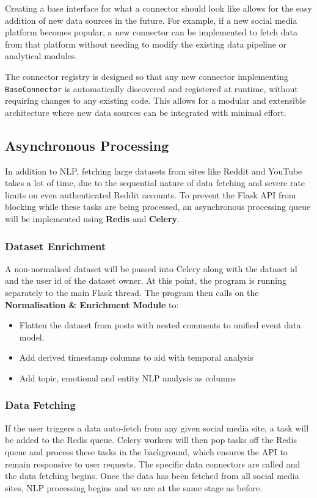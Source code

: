 \documentclass[12pt, a4paper]{article}
\begin{document}
Creating a base interface for what a connector should look like allows for the easy addition of new data sources in the future. For example, if a new social media platform becomes popular, a new connector can be implemented to fetch data from that platform without needing to modify the existing data pipeline or analytical modules.

The connector registry is designed so that any new connector implementing \texttt{BaseConnector} is automatically discovered and registered at runtime, without requiring changes to any existing code. This allows for a modular and extensible architecture where new data sources can be integrated with minimal effort.

\subsection{Asynchronous Processing}
In addition to NLP, fetching large datasets from sites like Reddit and YouTube takes a lot of time, due to the sequential nature of data fetching and severe rate limits on even authenticated Reddit accounts. To prevent the Flask API from blocking while these tasks are being processed, an asynchronous processing queue will be implemented using \textbf{Redis} and \textbf{Celery}.

\subsubsection{Dataset Enrichment}
A non-normalised dataset will be passed into Celery along with the dataset id and the user id of the dataset owner. At this point, the program is running separately to the main Flask thread. The program then calls on the \textbf{Normalisation \& Enrichment Module} to:
\begin{itemize}
    \item Flatten the dataset from posts with nested comments to unified event data model.
    \item Add derived timestamp columns to aid with temporal analysis
    \item Add topic, emotional and entity NLP analysis as columns
\end{itemize}

\subsubsection{Data Fetching}
If the user triggers a data auto-fetch from any given social media site, a task will be added to the Redis queue. Celery workers will then pop tasks off the Redis queue and process these tasks in the background, which ensures the API to remain responsive to user requests. The specific data connectors are called and the data fetching begins. Once the data has been fetched from all social media sites, NLP processing begins and we are at the same stage as before.
\end{document}
